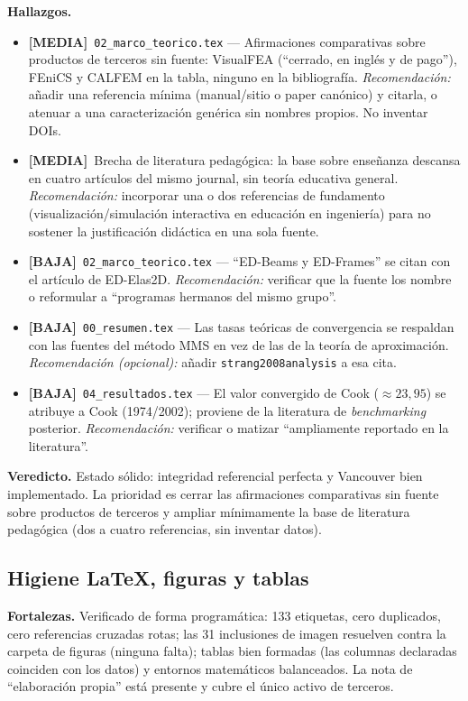 \documentclass[11pt,a4paper]{article}
\newcommand{\sevmedia}{\textcolor{cMedia}{\textbf{[MEDIA]}}}
\newcommand{\sevbaja}{\textcolor{cBaja}{\textbf{[BAJA]}}}
\newcommand{\fileref}[1]{\texttt{\small #1}}
\begin{document}
\textbf{Hallazgos.}
\begin{itemize}
  \item \sevmedia\ \fileref{02\_marco\_teorico.tex} — Afirmaciones comparativas sobre productos de terceros sin fuente: VisualFEA (``cerrado, en inglés y de pago''), FEniCS y CALFEM en la tabla, ninguno en la bibliografía. \textit{Recomendación:} añadir una referencia mínima (manual/sitio o paper canónico) y citarla, o atenuar a una caracterización genérica sin nombres propios. No inventar DOIs.
  \item \sevmedia\ Brecha de literatura pedagógica: la base sobre enseñanza descansa en cuatro artículos del mismo journal, sin teoría educativa general. \textit{Recomendación:} incorporar una o dos referencias de fundamento (visualización/simulación interactiva en educación en ingeniería) para no sostener la justificación didáctica en una sola fuente.
  \item \sevbaja\ \fileref{02\_marco\_teorico.tex} — ``ED-Beams y ED-Frames'' se citan con el artículo de ED-Elas2D. \textit{Recomendación:} verificar que la fuente los nombre o reformular a ``programas hermanos del mismo grupo''.
  \item \sevbaja\ \fileref{00\_resumen.tex} — Las tasas teóricas de convergencia se respaldan con las fuentes del método MMS en vez de las de la teoría de aproximación. \textit{Recomendación (opcional):} añadir \fileref{strang2008analysis} a esa cita.
  \item \sevbaja\ \fileref{04\_resultados.tex} — El valor convergido de Cook ($\approx 23{,}95$) se atribuye a Cook (1974/2002); proviene de la literatura de \textit{benchmarking} posterior. \textit{Recomendación:} verificar o matizar ``ampliamente reportado en la literatura''.
\end{itemize}

\textbf{Veredicto.} Estado sólido: integridad referencial perfecta y Vancouver bien implementado. La
prioridad es cerrar las afirmaciones comparativas sin fuente sobre productos de terceros y ampliar
mínimamente la base de literatura pedagógica (dos a cuatro referencias, sin inventar datos).

\subsection{Higiene \LaTeX, figuras y tablas}

\textbf{Fortalezas.} Verificado de forma programática: 133 etiquetas, cero duplicados, cero referencias
cruzadas rotas; las 31 inclusiones de imagen resuelven contra la carpeta de figuras (ninguna falta);
tablas bien formadas (las columnas declaradas coinciden con los datos) y entornos matemáticos
balanceados. La nota de ``elaboración propia'' está presente y cubre el único activo de terceros.
\end{document}
